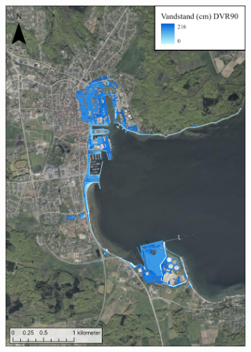 \begin{figure}[H]
    \begin{subfigure}[t]{0.5\textwidth}
        \centering
        \includegraphics[width=0.95\linewidth]{images/Resultater/2023Malt/2023 resultat_aabenraa.jpg}
        \caption{}
        \label{Subfig: Målt Aabenraa}
    \end{subfigure}
    \begin{subfigure}[t]{0.5\textwidth}
        \centering

\end{subfigure}
\end{figure}
